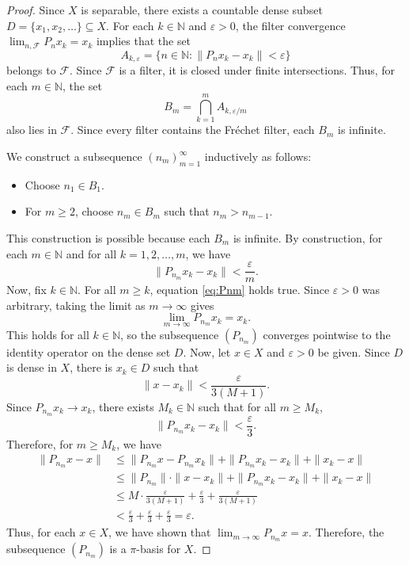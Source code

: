 \documentclass[12pt,fleqn]{amsart}
\renewcommand{\leq}{\leqslant}
\renewcommand{\geq}{\geqslant}
\theoremstyle{definition}
\theoremstyle{remark}
\begin{document}
\begin{proof}
Since \(X\) is separable, there exists a countable dense subset \(D = \{x_1, x_2, \dots\} \subseteq X\). For each \(k \in \mathbb{N}\) and \(\varepsilon > 0\), the filter convergence \(\lim_{n, \mathcal{F}} P_n x_k = x_k\) implies that the set
\[
A_{k, \varepsilon} = \{ n \in \mathbb{N} : \|P_n x_k - x_k\| < \varepsilon \}
\]
belongs to \(\mathcal{F}\).  Since \(\mathcal{F}\) is a filter, it is closed under finite intersections.  Thus, for each \(m \in \mathbb{N}\), the set
\[
B_m = \bigcap_{k=1}^m A_{k, \varepsilon/m}
\]
also lies in \(\mathcal{F}\).  Since every filter contains the Fréchet filter, each \(B_m\) is infinite.

We construct a subsequence \((n_m)_{m=1}^\infty\) inductively as follows:
\begin{itemize}
    \item Choose \(n_1 \in B_1\).
    \item For \(m \geq 2\), choose \(n_m \in B_m\) such that \(n_m > n_{m-1}\).
\end{itemize}
This construction is possible because each \(B_m\) is infinite.  By construction, for each \(m \in \mathbb{N}\) and for all \(k = 1, 2, \dots, m\), we have
\begin{equation}\label{eq:Pnm}
    \|P_{n_m} x_k - x_k\| < \frac{\varepsilon}{m}.
\end{equation}
Now, fix \(k \in \mathbb{N}\).  For all \(m \geq k\), equation \eqref{eq:Pnm} holds true. Since \(\varepsilon > 0\) was arbitrary, taking the limit as \(m \to \infty\) gives
\[
\lim_{m \to \infty} P_{n_m} x_k = x_k.
\]
This holds for all \(k \in \mathbb{N}\), so the subsequence \((P_{n_m})\) converges pointwise to the identity operator on the dense set \(D\). Now, let \(x \in X\) and \(\varepsilon > 0\) be given.  Since \(D\) is dense in \(X\), there is \(x_k \in D\) such that
\[
\|x - x_k\| < \frac{\varepsilon}{3(M + 1)}.
\]
Since \(P_{n_m} x_k \to x_k\), there exists \(M_k \in \mathbb{N}\) such that for all \(m \geq M_k\),
\[
\|P_{n_m} x_k - x_k\| < \frac{\varepsilon}{3}.
\]
Therefore, for \(m \geq M_k\), we have
\begin{align*}
\|P_{n_m} x - x\| &\leq \|P_{n_m} x - P_{n_m} x_k\| + \|P_{n_m} x_k - x_k\| + \|x_k - x\| \\
&\leq \|P_{n_m}\| \cdot \|x - x_k\| + \|P_{n_m} x_k - x_k\| + \|x_k - x\| \\
&\leq M \cdot \frac{\varepsilon}{3(M + 1)} + \frac{\varepsilon}{3} + \frac{\varepsilon}{3(M + 1)} \\
&< \frac{\varepsilon}{3} + \frac{\varepsilon}{3} + \frac{\varepsilon}{3} = \varepsilon.
\end{align*}
Thus, for each \(x \in X\), we have shown that  \(\lim_{m \to \infty} P_{n_m} x = x\).  Therefore, the subsequence \((P_{n_m})\) is a \(\pi\)-basis for \(X\).
\end{proof}
\end{document}
